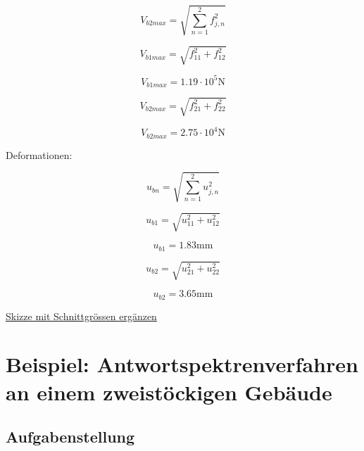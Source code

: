\documentclass[
  letterpaper,
  DIV=11]{scrreprt}
\begin{document}
\[V_{b2max} = \sqrt{\sum_{n=1}^2 f_{j,n}^2}\]

\begin{equation*}V_{b1 max} = \sqrt{f_{11}^{2} + f_{12}^{2}}\end{equation*}

\begin{equation*}V_{b1max} = 1.19 \cdot 10^{5} \text{N}\end{equation*}

\begin{equation*}V_{b2 max} = \sqrt{f_{21}^{2} + f_{22}^{2}}\end{equation*}

\begin{equation*}V_{b2max} = 2.75 \cdot 10^{4} \text{N}\end{equation*}

Deformationen:

\[u_{bn} = \sqrt{\sum_{n=1}^2 u_{j,n}^2}\]

\begin{equation*}u_{b1} = \sqrt{u_{11}^{2} + u_{12}^{2}}\end{equation*}

\begin{equation*}u_{b1} = 1.83 \text{mm}\end{equation*}

\begin{equation*}u_{b2} = \sqrt{u_{21}^{2} + u_{22}^{2}}\end{equation*}

\begin{equation*}u_{b2} = 3.65 \text{mm}\end{equation*}

\ul{Skizze mit Schnittgrössen ergänzen}

\hypertarget{beispiel-antwortspektrenverfahren-an-einem-zweistuxf6ckigen-gebuxe4ude}{%
\chapter{Beispiel: Antwortspektrenverfahren an einem zweistöckigen
Gebäude}\label{beispiel-antwortspektrenverfahren-an-einem-zweistuxf6ckigen-gebuxe4ude}}

\hypertarget{aufgabenstellung-14}{%
\section{Aufgabenstellung}\label{aufgabenstellung-14}}
\end{document}
